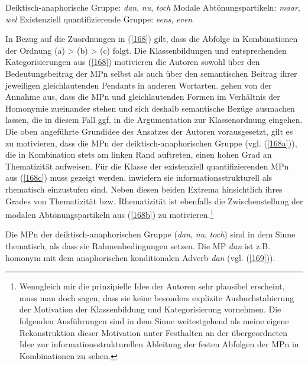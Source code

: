 \begin{exe}
	\ex\label{168} 
		\begin{xlist}	
			\ex\label{168a} Deiktisch-anaphorische Gruppe:  \textit{dan}, \textit{nu}, \textit{toch}
			\ex\label{168b} Modale Abtönungspartikeln:  \textit{maar}, \textit{wel}
			\ex\label{168c} Existenziell quantifizierende Gruppe:  \textit{eens}, \textit{even}
		\end{xlist}
\end{exe}
In Bezug auf die Zuordnungen in (\ref{168}) gilt, dass die Abfolge in Kombinationen der Ordnung (a) > (b) > (c) folgt. Die Klassenbildungen und entsprechenden Ka\-tegorisierungen aus (\ref{168}) motivieren die Autoren sowohl über den Bedeutungsbeitrag der MPn selbst als auch über den semantischen Beitrag ihrer jeweiligen gleichlautenden Pendants in anderen Wortarten. \citet{Vriendt1991} gehen von der Annahme aus, dass die MPn und gleichlautenden Formen im Verhältnis der Homonymie zueinander stehen und sich deshalb semantische Bezüge ausmachen lassen, die in diesem Fall ggf. in die Argumentation zur Klassenordnung eingehen. Die oben angeführte Grundidee des Ansatzes der Autoren vorausgesetzt, gilt es zu motivieren, dass die MPn der deiktisch-anaphorischen Gruppe (vgl. (\ref{168a})), die in Kombination stets am linken Rand auftreten, einen hohen Grad an Thematizität  aufweisen. Für die Klasse der e\-xistenziell quantifizierenden MPn aus (\ref{168c}) muss gezeigt werden, inwiefern sie informationsstrukturell als rhematisch einzustufen sind. Neben diesen beiden  \glq Extrema\grq {} hinsichtlich ihres Grades von Thematizität bzw. Rhematizität  ist ebenfalls die Zwischenstellung der modalen Abtönungspartikeln aus (\ref{168b}) zu motivieren.\footnote{ Wenngleich mir die prinzipielle Idee der Autoren sehr plausibel erscheint, muss man doch sagen, dass sie keine besonders explizite Ausbuchstabierung der Motivation der Klassenbildung und Kategorisierung vornehmen. Die folgenden Ausführungen sind in dem Sinne weitestgehend als meine eigene Rekonstruktion dieser Motivation unter Festhalten an der übergeordneten Idee zur informationsstrukturellen Ableitung der festen Abfolgen der MPn in Kombinationen zu sehen.}

Die MPn der deiktisch-anaphorischen Gruppe (\textit{dan}, \textit{nu}, \textit{toch}) sind in dem Sinne thematisch, als dass sie Rahmenbedingungen setzen. Die MP \textit{dan} ist z.B. homonym  mit dem anaphorischen konditionalen Adverb \textit{dan} (vgl. (\ref{169})).

